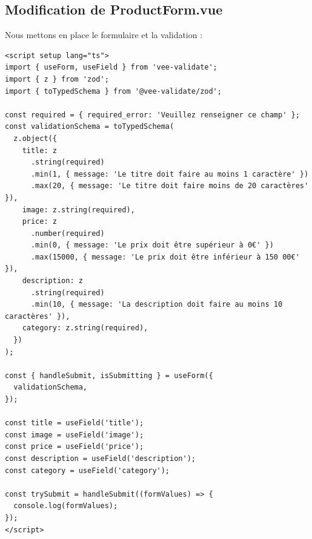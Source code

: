 \subsection{Modification de {\color{monOrange}ProductForm.vue}}
Nous mettons en place le formulaire et la validation :
\begin{verbatim}
<script setup lang="ts">
import { useForm, useField } from 'vee-validate';
import { z } from 'zod';
import { toTypedSchema } from '@vee-validate/zod';

const required = { required_error: 'Veuillez renseigner ce champ' };
const validationSchema = toTypedSchema(
  z.object({
    title: z
      .string(required)
      .min(1, { message: 'Le titre doit faire au moins 1 caractère' })
      .max(20, { message: 'Le titre doit faire moins de 20 caractères' }),
    image: z.string(required),
    price: z
      .number(required)
      .min(0, { message: 'Le prix doit être supérieur à 0€' })
      .max(15000, { message: 'Le prix doit être inférieur à 150 00€' }),
    description: z
      .string(required)
      .min(10, { message: 'La description doit faire au moins 10 caractères' }),
    category: z.string(required),
  })
);

const { handleSubmit, isSubmitting } = useForm({
  validationSchema,
});

const title = useField('title');
const image = useField('image');
const price = useField('price');
const description = useField('description');
const category = useField('category');

const trySubmit = handleSubmit((formValues) => {
  console.log(formValues);
});
</script>


\end{verbatim}
